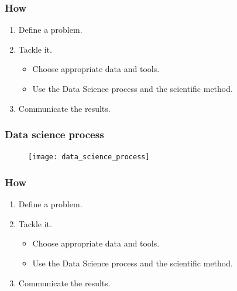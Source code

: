 \documentclass[aspectratio=169]{beamer}
\begin{document}

\begin{frame}
	\frametitle{How}
	\begin{enumerate}
		\item {\color{lightgray} Define a problem.}
		\vfill
		\item Tackle it.
			\vspace{1em}
			\begin{itemize}
				\item Choose appropriate data and tools.
				\vspace{1em}
				\item Use the Data Science process and the scientific method.
			\end{itemize}
		\vfill
		\color{lightgray}
		\item Communicate the results.
	\end{enumerate}
\end{frame}




\begin{frame}
	\frametitle{Data science process}
	\begin{figure}
		\texttt{[image: data\_science\_process]}
	\end{figure}
\end{frame}


\begin{frame}
	\frametitle{How}
	\begin{enumerate}
		\item {\color{lightgray} Define a problem.}
		\vfill
		\item {\color{lightgray} Tackle it.}
			\vspace{1em}
			\begin{itemize}
				\color{lightgray}
				\item Choose appropriate data and tools.
				\vspace{1em}
				\item Use the Data Science process and the scientific method.
			\end{itemize}
		\vfill
		\item Communicate the results.
	\end{enumerate}
\end{frame}
\end{document}
